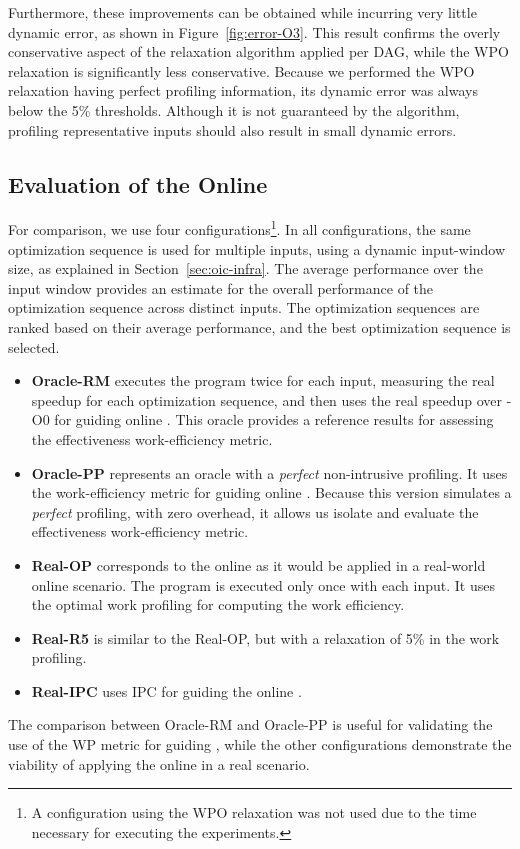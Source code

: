 Furthermore, these improvements can be obtained while incurring very little dynamic error, as shown in Figure~\ref{fig:error-O3}.
This result confirms the overly conservative aspect of the relaxation algorithm applied per DAG,
while the WPO relaxation is significantly less conservative.
Because we performed the WPO relaxation having perfect profiling information, its dynamic error was always below the 5\% thresholds.
Although it is not guaranteed by the algorithm, profiling representative inputs should also result in small dynamic errors.

\subsection{Evaluation of the Online {\IterComp}}

For comparison, we use four configurations\footnote{A configuration using the WPO relaxation was not used due to the time necessary for executing the experiments.}.
In all configurations, the same optimization sequence is used for multiple inputs, using a dynamic input-window size, as explained in Section~\ref{sec:oic-infra}.
The average performance over the input window provides an estimate for the overall performance of the optimization sequence across distinct inputs.
The optimization sequences are ranked based on their average performance, and the best optimization sequence is selected.
\begin{itemize}
\item \textbf{Oracle-RM} executes the program twice for each input, measuring the real speedup for each optimization sequence, and then uses the real speedup over {\flagstype -O0} for guiding online {\itercomp}. This oracle provides a reference results for assessing the effectiveness work-efficiency metric.
\item \textbf{Oracle-PP} represents an oracle with a \textit{perfect} non-intrusive profiling.
  It uses the work-efficiency metric for guiding online {\itercomp}.
  Because this version simulates a \textit{perfect} profiling, with zero overhead,
  it allows us isolate and evaluate the effectiveness work-efficiency metric.
\item \textbf{Real-OP} corresponds to the online {\itercomp} as it would be applied in a real-world online scenario.
  The program is executed only once with each input.
  It uses the optimal work profiling for computing the work efficiency.
\item \textbf{Real-R5} is similar to the {Real-OP}, but with a relaxation of 5\% in the work profiling.
\item \textbf{Real-IPC} uses IPC for guiding the online {\itercomp}.
\end{itemize}
The comparison between Oracle-RM and Oracle-PP is useful for validating the use of the WP metric for guiding {\itercomp}, while the other configurations demonstrate the viability of applying the online {\itercomp} in a real scenario.

